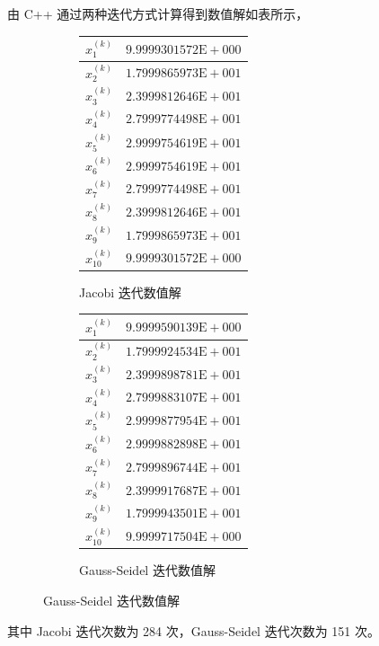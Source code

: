 \documentclass[11pt]{article}
\begin{document}
由 C++ 通过两种迭代方式计算得到数值解如表所示，
\begin{figure}[h]
    \centering
    \begin{subfigure}{.49\textwidth}
        \centering
        \begin{tabular}{|c|c|}
            \hline $x^{(k)}_1$    & $9.9999301572\text{E}{+}000$ \\
            \hline $x^{(k)}_2$    & $1.7999865973\text{E}{+}001$ \\
            \hline $x^{(k)}_3$    & $2.3999812646\text{E}{+}001$ \\
            \hline $x^{(k)}_4$    & $2.7999774498\text{E}{+}001$ \\
            \hline $x^{(k)}_5$    & $2.9999754619\text{E}{+}001$ \\
            \hline $x^{(k)}_6$    & $2.9999754619\text{E}{+}001$ \\
            \hline $x^{(k)}_7$    & $2.7999774498\text{E}{+}001$ \\
            \hline $x^{(k)}_8$    & $2.3999812646\text{E}{+}001$ \\
            \hline $x^{(k)}_9$    & $1.7999865973\text{E}{+}001$ \\
            \hline $x^{(k)}_{10}$ & $9.9999301572\text{E}{+}000$ \\
            \hline
        \end{tabular}
        \caption{Jacobi 迭代数值解}
    \end{subfigure}
    \begin{subfigure}{.49\textwidth}
        \centering
        \begin{tabular}{|c|c|}
            \hline $x^{(k)}_1$    & $9.9999590139\text{E}{+}000$ \\
            \hline $x^{(k)}_2$    & $1.7999924534\text{E}{+}001$ \\
            \hline $x^{(k)}_3$    & $2.3999898781\text{E}{+}001$ \\
            \hline $x^{(k)}_4$    & $2.7999883107\text{E}{+}001$ \\
            \hline $x^{(k)}_5$    & $2.9999877954\text{E}{+}001$ \\
            \hline $x^{(k)}_6$    & $2.9999882898\text{E}{+}001$ \\
            \hline $x^{(k)}_7$    & $2.7999896744\text{E}{+}001$ \\
            \hline $x^{(k)}_8$    & $2.3999917687\text{E}{+}001$ \\
            \hline $x^{(k)}_9$    & $1.7999943501\text{E}{+}001$ \\
            \hline $x^{(k)}_{10}$ & $9.9999717504\text{E}{+}000$ \\
            \hline
        \end{tabular}
        \caption{Gauss-Seidel 迭代数值解}
    \end{subfigure}
\end{figure}
其中 Jacobi 迭代次数为 284 次，Gauss-Seidel 迭代次数为 151 次。
\end{document}
